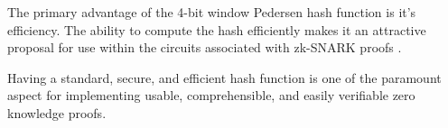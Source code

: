 
{\color{purple} The primary advantage of the 4-bit window Pedersen hash function is it's efficiency. The ability to compute the hash efficiently makes it an attractive proposal for use within the circuits associated with zk-SNARK proofs .}

{\color{purple} Having a standard, secure, and efficient hash function is one of the paramount aspect for implementing usable, comprehensible, and easily verifiable zero knowledge proofs.}
